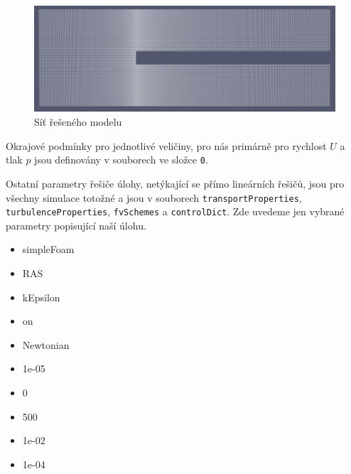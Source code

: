 \documentclass[a4paper,12pt]{report}
\theoremstyle{remark}
\begin{document}
\begin{figure}[H]
	\centering
	\includegraphics[width=1\linewidth]{pv-mesh.png}
	\caption{Síť řešeného modelu}
	\label{fig:pvmesh}
\end{figure}


Okrajové podmínky pro jednotlivé veličiny, pro nás primárně pro rychlost $U$ a tlak $p$  jsou definovány v souborech ve složce \texttt{0}.

Ostatní parametry řešiče úlohy, netýkající se přímo lineárních řešičů, jsou pro všechny simulace totožné a jsou v souborech \texttt{transportProperties}, \linebreak \texttt{turbulenceProperties}, \texttt{fvSchemes} a \texttt{controlDict}. Zde uvedeme jen vybrané parametry popisující naší úlohu.

\begin{itemize}
	\item{simpleFoam}
	\item{RAS}
	\item{kEpsilon}
	\item{on}
	\item{Newtonian}
	\item{1e-05}
	\item{0}
	\item{500}		
	\item{1e-02}
	\item{1e-04}
\end{itemize}
	
\end{document}
